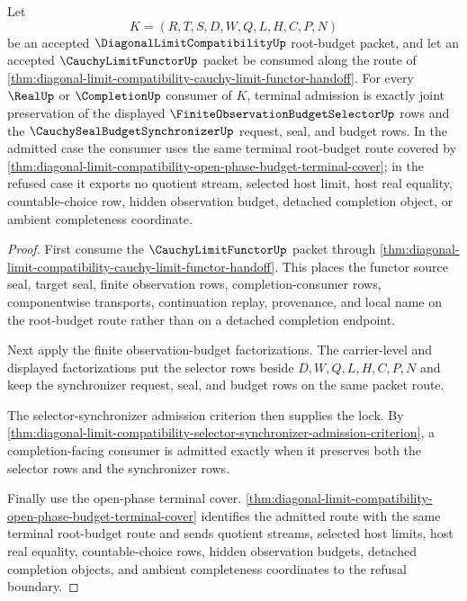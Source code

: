 \begin{theorem}
\label{thm:diagonal-limit-compatibility-root-budget-functor-selector-lock}
Let
$$
K=(R,T,S,D,W,Q,L,H,C,P,N)
$$
be an accepted $\DiagonalLimitCompatibilityUp$ root-budget packet, and let an accepted $\CauchyLimitFunctorUp$ packet be consumed along the route of \autoref{thm:diagonal-limit-compatibility-cauchy-limit-functor-handoff}. For every $\RealUp$ or $\CompletionUp$ consumer of $K$, terminal admission is exactly joint preservation of the displayed $\FiniteObservationBudgetSelectorUp$ rows and the $\CauchySealBudgetSynchronizerUp$ request, seal, and budget rows. In the admitted case the consumer uses the same terminal root-budget route covered by \autoref{thm:diagonal-limit-compatibility-open-phase-budget-terminal-cover}; in the refused case it exports no quotient stream, selected host limit, host real equality, countable-choice row, hidden observation budget, detached completion object, or ambient completeness coordinate.
\end{theorem}
\begin{proof}
First consume the $\CauchyLimitFunctorUp$ packet through \autoref{thm:diagonal-limit-compatibility-cauchy-limit-functor-handoff}. This places the functor source seal, target seal, finite observation rows, completion-consumer rows, componentwise transports, continuation replay, provenance, and local name on the root-budget route rather than on a detached completion endpoint.

Next apply the finite observation-budget factorizations. The carrier-level and displayed factorizations put the selector rows beside $D,W,Q,L,H,C,P,N$ and keep the synchronizer request, seal, and budget rows on the same packet route.

The selector-synchronizer admission criterion then supplies the lock. By \autoref{thm:diagonal-limit-compatibility-selector-synchronizer-admission-criterion}, a completion-facing consumer is admitted exactly when it preserves both the selector rows and the synchronizer rows.

Finally use the open-phase terminal cover. \autoref{thm:diagonal-limit-compatibility-open-phase-budget-terminal-cover} identifies the admitted route with the same terminal root-budget route and sends quotient streams, selected host limits, host real equality, countable-choice rows, hidden observation budgets, detached completion objects, and ambient completeness coordinates to the refusal boundary.
\end{proof}
